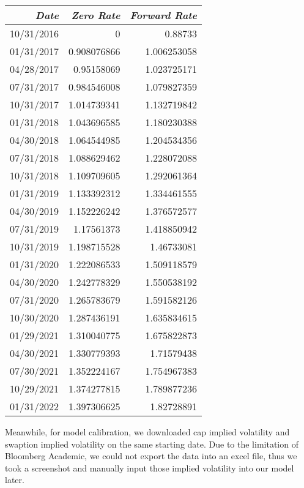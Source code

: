\documentclass[paper = letterpaper, fontsize=12pt]{article}
\begin{document}
\begin{center}
\begin{tabular}{rrr} \toprule
\emph{Date} & \emph{Zero Rate} & \emph{Forward Rate} \\
	    \midrule
	    10/31/2016 & 0     & 0.88733 \\
	    01/31/2017 & 0.908076866 & 1.006253058 \\
	    04/28/2017 & 0.95158069 & 1.023725171 \\
	    07/31/2017 & 0.984546008 & 1.079827359 \\
	    10/31/2017 & 1.014739341 & 1.132719842 \\
	    01/31/2018 & 1.043696585 & 1.180230388 \\
	    04/30/2018 & 1.064544985 & 1.204534356 \\
	    07/31/2018 & 1.088629462 & 1.228072088 \\
	    10/31/2018 & 1.109709605 & 1.292061364 \\
	    01/31/2019 & 1.133392312 & 1.334461555 \\
	    04/30/2019 & 1.152226242 & 1.376572577 \\
	    07/31/2019 & 1.17561373 & 1.418850942 \\
	    10/31/2019 & 1.198715528 & 1.46733081 \\
	    01/31/2020 & 1.222086533 & 1.509118579 \\
	    04/30/2020 & 1.242778329 & 1.550538192 \\
	    07/31/2020 & 1.265783679 & 1.591582126 \\
	    10/30/2020 & 1.287436191 & 1.635834615 \\
	    01/29/2021 & 1.310040775 & 1.675822873 \\
	    04/30/2021 & 1.330779393 & 1.71579438 \\
	    07/30/2021 & 1.352224167 & 1.754967383 \\
	    10/29/2021 & 1.374277815 & 1.789877236 \\
	    01/31/2022 & 1.397306625 & 1.82728891 \\\bottomrule
	     \hline
	  \end{tabular}
	  \end{center}


Meanwhile, for model calibration, we downloaded cap implied volatility and swaption implied volatility on the same starting date. Due to the limitation of Bloomberg Academic, we could not export the data into an excel file, thus we took a screenshot and manually input those implied volatility into our model later.
\end{document}
